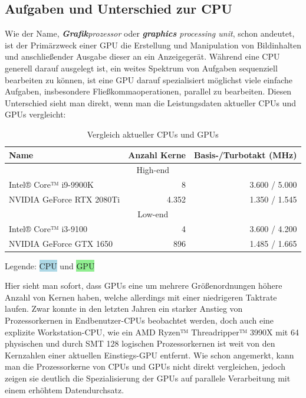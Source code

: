 \documentclass[oneside]{ausarbeitung}
\begin{document}
\subsection{Aufgaben und Unterschied zur CPU}
\label{sub:GPU_tasks}
Wie der Name, \textit{\textbf{Grafik}prozessor} oder \textit{\textbf{graphics} processing unit}, schon andeutet, ist der Primärzweck einer \ac{GPU} die Erstellung und Manipulation von Bildinhalten und anschließender Ausgabe dieser an ein Anzeigegerät. Während eine \ac{CPU} generell darauf ausgelegt ist, ein weites Spektrum von Aufgaben sequenziell bearbeiten zu können, ist eine \ac{GPU} darauf spezialisiert möglichst viele einfache Aufgaben, insbesondere Fließkommaoperationen, parallel zu bearbeiten. Diesen Unterschied sieht man direkt, wenn man die Leistungsdaten aktueller \ac{CPU}s und \ac{GPU}s vergleicht:

\begin{table}
\begin{center}
\begin{tabular}{ |l|r|r| }
    \hline
    Name & Anzahl Kerne & Basis-/Turbotakt (MHz) \\
    \hline
    \multicolumn{3}{|c|}{High-end} \\
    \hline
    \rowcolor{lightblue}
    Intel® Core™ i9-9900K \cite{intel:i9_9900k} & 8 & 3.600 / 5.000 \\
    \rowcolor{lightgreen}
    NVIDIA GeForce RTX 2080Ti \cite{nvidia:rtx_2080ti} & 4.352 & 1.350 / 1.545 \\
    \hline
    \multicolumn{3}{|c|}{Low-end} \\
    \hline
    \rowcolor{lightblue}
    Intel® Core™ i3-9100 \cite{intel:i3_9100} & 4 & 3.600 / 4.200 \\
    \rowcolor{lightgreen}
    NVIDIA GeForce GTX 1650 \cite{nvidia:gtx_1650} & 896 & 1.485 / 1.665 \\
    \hline
\end{tabular}
Legende: \colorbox{lightblue}{\ac{CPU}} und \colorbox{lightgreen}{\ac{GPU}}
\end{center}
\caption{Vergleich aktueller CPUs und GPUs}
\end{table}

Hier sieht man sofort, dass \ac{GPU}s eine um mehrere Größenordnungen höhere Anzahl von Kernen haben, welche allerdings mit einer niedrigeren Taktrate laufen. Zwar konnte in den letzten Jahren ein starker Anstieg von Prozessorkernen in Endbenutzer-\ac{CPU}s beobachtet werden, doch auch eine explizite Workstation-\ac{CPU}, wie ein AMD Ryzen™ Threadripper™ 3990X \cite{amd:threadripper_3990x} mit 64 physischen und durch \ac{SMT} 128 logischen Prozessorkernen ist weit von den Kernzahlen einer aktuellen Einstiegs-\ac{GPU} entfernt. Wie schon angemerkt, kann man die Prozessorkerne von \ac{CPU}s und \ac{GPU}s nicht direkt vergleichen, jedoch zeigen sie deutlich die Spezialisierung der \ac{GPU}s auf parallele Verarbeitung mit einem erhöhtem Datendurchsatz. 
\end{document}
